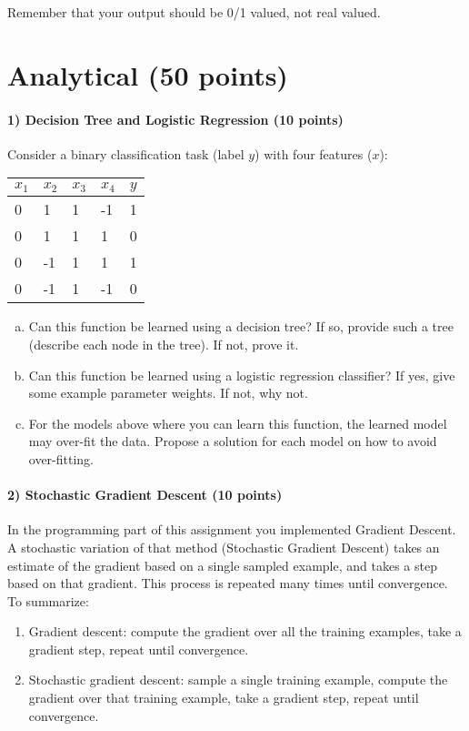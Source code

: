 \documentclass[11pt]{article}
\begin{document}
Remember that your output should be 0/1 valued, not real valued.

\section{Analytical (50 points)}

\paragraph{1) Decision Tree and Logistic Regression (10 points)}
Consider a binary classification task (label $y$) with four features ($x$):

\begin{tabular}{ |l|l|l|l|l| }
\hline
$x_1$ & $x_2$ & $x_3$ & $x_4$ & $y$ \\
\hline
 0& 1 & 1& -1 & 1 \\
 0&  1 & 1& 1 & 0 \\
 0&  -1 & 1& 1 & 1 \\
 0&  -1 & 1& -1 & 0 \\
\hline
\end{tabular}

\begin{enumerate}[(a)]
\item Can this function be learned using a decision tree? If so, provide such a tree (describe each node in the tree). If not, prove it.

\item Can this function be learned using a logistic regression classifier? If yes, give some example parameter weights. If not, why not.

\item For the models above where you can learn this function, the learned model may over-fit the data. Propose a solution for each model on how to avoid over-fitting.
\end{enumerate}

\paragraph{2) Stochastic Gradient Descent (10 points)}
In the programming part of this assignment you implemented Gradient Descent. A stochastic variation of that method (Stochastic Gradient Descent) takes an estimate of the gradient based on a single sampled example, and takes a step based on that gradient. This process is repeated many times until convergence. To summarize:
\begin{enumerate}
\item Gradient descent: compute the gradient over all the training examples, take a gradient step, repeat until convergence.
\item Stochastic gradient descent: sample a single training example, compute the gradient over that training example, take a gradient step, repeat until convergence.
\end{enumerate}
\end{document}
